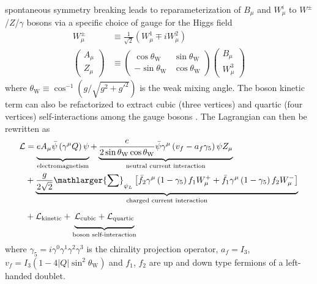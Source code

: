 \documentclass[../thesis.tex]{subfiles}
\begin{document}
spontaneous symmetry breaking leads to reparameterization of $B_\mu$ and $W_\mu^i$ to $W^\pm$/$Z$/$\gamma$ bosons via a specific choice of gauge for the Higgs field
\begin{equation}
\begin{aligned}
\label{eq:EW_repara}
W^\pm_\mu &\equiv \frac{1}{\sqrt{2}}\left(W^1_\mu \mp iW^2_\mu\right) \\ 
\begin{pmatrix}
A_\mu \\ Z_\mu
\end{pmatrix}
&\equiv \begin{pmatrix}
\cos \theta_\text{W} & \sin \theta_\text{W} \\
-\sin \theta_\text{W} & \cos \theta_\text{W}
\end{pmatrix}
\begin{pmatrix}
B_\mu \\ W_\mu^3
\end{pmatrix}
\end{aligned}
\end{equation}
where $\theta_\text{W}\equiv\cos^{-1}\left(g/\sqrt{g^2+g'^2}\right)$ is the weak mixing angle. The boson kinetic term can also be refactorized to extract cubic (three vertices) and quartic (four vertices) self-interactions among the gauge bosons \citep{theory:ew}. The Lagrangian can then be rewritten as
\begin{equation}
\begin{aligned}
\label{eq:EW_L}
\mathcal{L} &=
\underbrace{\vphantom{\displaystyle\frac{e}{2\sin\theta_\text{W}}}
eA_\mu\bar{\psi}\left(\gamma^\mu Q\right)\psi
}_\text{electromagnetism}
+\underbrace{
\displaystyle\frac{e}{2\sin\theta_\text{W}\cos\theta_\text{W}}\bar{\psi}\gamma^\mu\left(v_f-a_f\gamma_5 \right)\psi Z_\mu
}_\text{neutral current interaction} \\
&+\underbrace{
\displaystyle\frac{g}{2\sqrt{2}}\mathlarger{\sum}_{\psi_L}
\left[ \bar{f}_2\gamma^\mu\left(1-\gamma_5\right)f_1 W_\mu^+ + \bar{f}_1\gamma^\mu\left(1-\gamma_5\right)f_2 W_\mu^- \right]
}_\text{charged current interaction} \\
&+\mathcal{L}_\text{kinetic}+\underbrace{\vphantom{\frac{1}{4}}
\mathcal{L}_\text{cubic}+\mathcal{L}_\text{quartic}
}_\text{boson self-interaction}
\end{aligned}
\end{equation}
where $\gamma_5=i\gamma^0\gamma^1\gamma^2\gamma^3$ is the chirality projection operator, $a_f=I_3$, $v_f=I_3(1-4|Q|\sin^2\theta_\text{W})$ and $f_1$, $f_2$ are up and down type fermions of a left-handed doublet.
\end{document}
